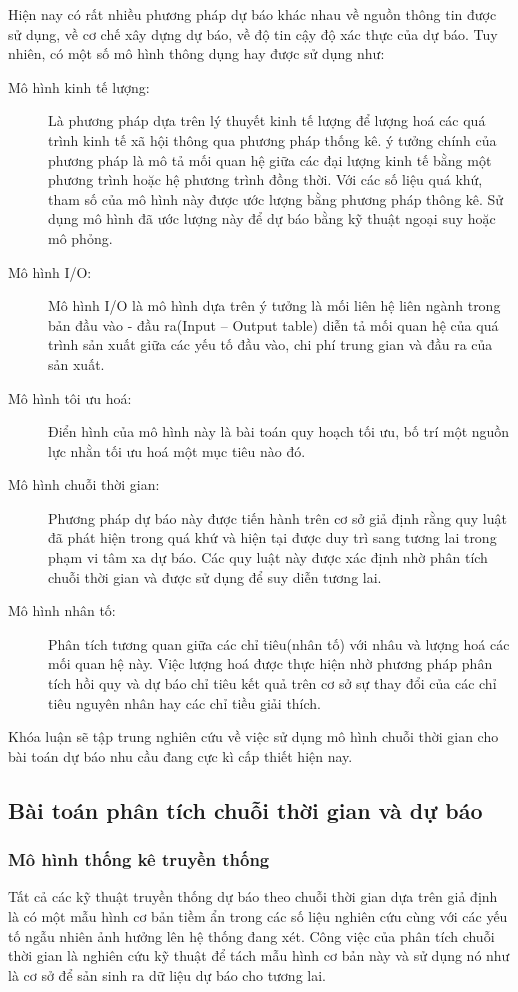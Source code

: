 \documentclass[twoside,12pt]{Latex/Classes/PhDthesisPSnPDF}
\begin{document}
Hiện nay có rất nhiều phương pháp dự báo khác nhau về nguồn thông tin được sử dụng, về cơ chế xây dựng dự báo, về độ tin cậy độ xác thực của dự báo. Tuy nhiên, có một số mô hình thông dụng hay được sử dụng \cite{efin} như:
\begin{description}
\item[Mô hình kinh tế lượng:] Là phương pháp dựa trên lý thuyết kinh tế lượng để lượng hoá các quá trình kinh tế xã hội thông qua phương pháp thống kê. ý tưởng chính của phương pháp là mô tả mối quan hệ giữa các đại lượng kinh tế bằng một phương trình hoặc hệ phương trình đồng thời. Với các số liệu quá khứ, tham số của mô hình này được ước lượng bằng phương pháp thông kê. Sử dụng mô hình đã ước lượng này để dự báo bằng kỹ thuật ngoại suy hoặc mô phỏng.
\item [Mô hình I/O:] Mô hình I/O là mô hình dựa trên ý tưởng là mối liên hệ liên ngành trong bản đầu vào - đầu ra(Input – Output table) diễn tả mối quan hệ của quá trình sản xuất giữa các yếu tố đầu vào, chi phí trung gian và đầu ra của sản xuất.
\item[Mô hình tôi ưu hoá:] Điển hình của mô hình này là bài toán quy hoạch tối ưu, bố trí một nguồn lực nhằn tối ưu hoá một mục tiêu nào đó.
\item[Mô hình chuỗi thời gian:] Phương pháp dự báo này được tiến hành trên cơ sở giả định rằng quy luật đã phát hiện trong quá khứ và hiện tại được duy trì sang tương lai trong phạm vi tâm xa dự báo. Các quy luật này được xác định nhờ phân tích chuỗi thời gian và được sử dụng để suy diễn tương lai.
\item [Mô hình nhân tố:] Phân tích tương quan giữa các chỉ tiêu(nhân tố) với nhâu và lượng hoá các mối quan hệ này. Việc lượng hoá được thực hiện nhờ phương pháp phân tích hồi quy và dự báo chỉ tiêu kết quả trên cơ sở sự thay đổi của các chỉ tiêu nguyên nhân hay các chỉ tiều giải thích.
\end{description}
Khóa luận sẽ tập trung nghiên cứu về việc sử dụng mô hình chuỗi thời gian cho bài toán dự báo nhu cầu đang cực kì cấp thiết hiện nay.
\subsection{Bài toán phân tích chuỗi thời gian và dự báo}
\subsubsection{Mô hình thống kê truyền thống}
Tất cả các kỹ thuật truyền thống dự báo theo chuỗi thời gian dựa trên giả định là có một mẫu hình cơ bản tiềm ẩn trong các số liệu nghiên cứu cùng với các yếu tố ngẫu nhiên ảnh hưởng lên hệ thống đang xét. Công việc của phân tích chuỗi thời gian là nghiên cứu kỹ thuật để tách mẫu hình cơ bản này và sử dụng nó như là cơ sở để sản sinh ra dữ liệu dự báo cho tương lai.
\end{document}
